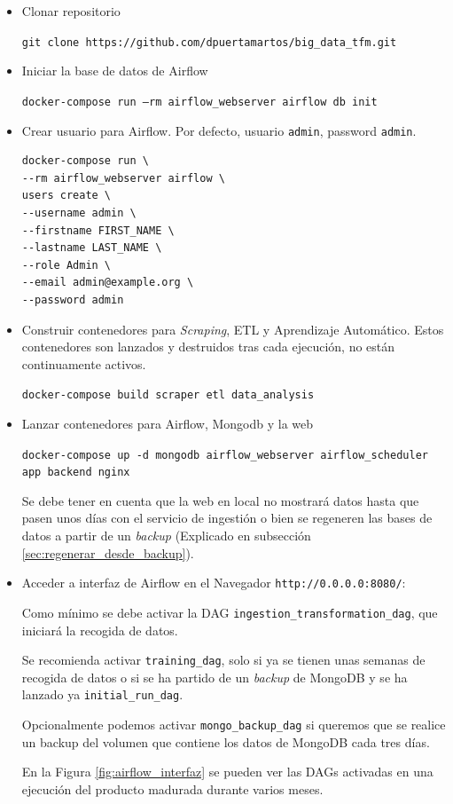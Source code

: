 \begin{itemize}
    \item Clonar repositorio

    \texttt{git clone https://github.com/dpuertamartos/big\_data\_tfm.git}

    \item Iniciar la base de datos de Airflow

    \texttt{docker-compose run --rm airflow\_webserver airflow db init}

    \item Crear usuario para Airflow. Por defecto, usuario \texttt{admin}, password \texttt{admin}.

\begin{lstlisting}
docker-compose run \
--rm airflow_webserver airflow \
users create \
--username admin \
--firstname FIRST_NAME \
--lastname LAST_NAME \
--role Admin \
--email admin@example.org \
--password admin 
\end{lstlisting}

    \item Construir contenedores para \textit{Scraping}, ETL y Aprendizaje Automático. Estos contenedores son lanzados y destruidos tras cada ejecución, no están continuamente activos.

    \texttt{docker-compose build scraper etl data\_analysis}

    \item Lanzar contenedores para Airflow, Mongodb y la web

    \texttt{docker-compose up -d mongodb airflow\_webserver airflow\_scheduler app backend nginx}

    Se debe tener en cuenta que la web en local no mostrará datos hasta que pasen unos días con el servicio de ingestión o bien se regeneren las bases de datos a partir de un \textit{backup} (Explicado en subsección \ref{sec:regenerar_desde_backup}).

    \item Acceder a interfaz de Airflow en el Navegador \texttt{http://0.0.0.0:8080/}:
    
    Como mínimo se debe activar la DAG \texttt{ingestion\_transformation\_dag}, que iniciará la recogida de datos. 
    
    Se recomienda activar \texttt{training\_dag}, solo si ya se tienen unas semanas de recogida de datos o si se ha partido de un \textit{backup} de MongoDB y se ha lanzado ya \texttt{initial\_run\_dag}.

    Opcionalmente podemos activar \texttt{mongo\_backup\_dag} si queremos que se realice un backup del volumen que contiene los datos de MongoDB cada tres días.

    En la Figura \ref{fig:airflow_interfaz} se pueden ver las DAGs activadas en una ejecución del producto madurada durante varios meses. 
\end{itemize}

